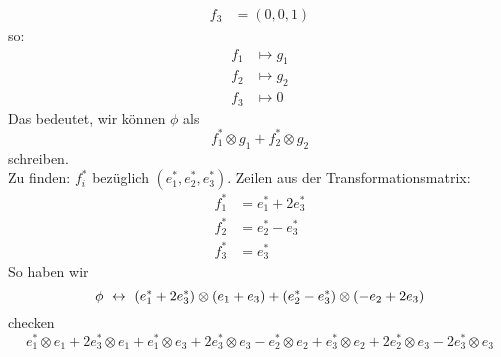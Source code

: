 \begin{Bsp}
\begin{align*}
    f_3&=\left( 0,0,1 \right)
  \end{align*}
  so:
  \begin{align*}
    f_1&\mapsto g_1\\
    f_2&\mapsto g_2\\
    f_3&\mapsto 0
  \end{align*}
  Das bedeutet, wir können $\phi$ als
  \[f_1^*\otimes g_1+f_2^*\otimes g_2\]
  schreiben.\\
  Zu finden: $f_i^*$ bezüglich $\left( e_1^*,e_2^*,e_3^* \right)$. Zeilen aus der Transformationsmatrix:
  \begin{align*}
    f_1^*&=e_1^*+2e_3^*\\
    f_2^*&=e_2^*-e_3^*\\
    f_3^*&=e_3^*
  \end{align*}
  So haben wir
  \[\phi\ \leftrightarrow\ \left( e_1^*+2e_3^* \right)\otimes \left( e_1+e_3 \right)+\left( e_2^*-e_3^* \right)\otimes \left( -e_2+2e_3 \right)\]
  checken
  \[e_1^*\otimes e_1+2e_3^*\otimes e_1+e_1^*\otimes e_3+2e_3^*\otimes e_3 -e_2^*\otimes e_2+e_3^*\otimes e_2+2e_2^*\otimes e_3-2e_3^*\otimes e_3\]
\end{Bsp}
